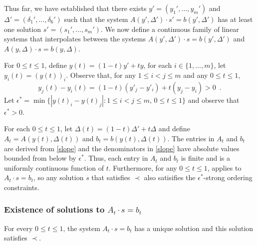 \documentclass{patmorin}
\begin{document}
   Thus far, we have established that there exists $y'=(y_1',\ldots,y_m')$
   and $\Delta'=(\delta_1',\ldots,\delta_6')$ such that the
   system $A(y',\Delta')\cdot s' = b(y',\Delta')$ has at least one
   solution $s'=(s_1',\ldots,s_m')$.  We now define a continuous
   family of linear systems that interpolates between the systems
   $A(y',\Delta')\cdot s=b(y',\Delta')$ and $A(y,\Delta)\cdot s=b(y,\Delta)$.

   For $0\le t\le 1$, define $y(t) = (1-t)y' + ty$, for each
   $i\in\{1,\ldots,m\}$, let $y_i(t)=(y(t))_i$.  Observe that, for any
   $1\le i< j\le m$ and any $0\le t\le 1$,
   \[
       y_j(t) - y_i(t) = (1-t)(y'_j-y'_i) + t(y_j-y_i) > 0 \enspace .
   \]
   Let $\epsilon^*=\min\{|y(t)_i-y(t)_j| : 1\le i< j\le m,\, 0\le t\le 1\}$
   and observe that $\epsilon^* >0$.

   For each $0\le t\le 1$, let $\Delta(t)=(1-t)\Delta' + t\Delta$ and define
   $A_t=A(y(t),\Delta(t))$ and $b_t=b(y(t),\Delta(t))$.  The entries in
   $A_t$ and $b_t$ are derived from \eqref{slope} and the denominators in
   \eqref{slope} have absolute values bounded from below by $\epsilon^*$.
   Thus, each entry in $A_t$ and $b_t$ is finite and is a uniformly
   continuous function of $t$.  Furthermore, for any $0\le t\le 1$,
    applies to $A_t\cdot s =b_t$, so any solution
   $s$ that satisfies $\prec$ also satisifies the $\epsilon^*$-strong
   ordering constraints.

\subsubsection{Existence of solutions to $A_t\cdot s=b_t$}


\begin{lem}
   For every $0\le t\le 1$, the system $A_t\cdot s=b_t$ has a unique solution
   and this solution satisfies $\prec$.
\end{lem}
\end{document}
